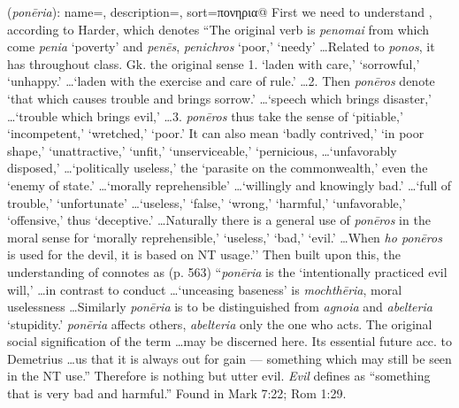 \item[Evil,]

(\textit{ponēria}):
{
    name=,
    description={},
    sort=πονηρια@
}
First we need to understand , according to Harder, which denotes ``The original verb is \emph{penomai} from which come \emph{penia} `poverty' and \emph{penēs}, \emph{penichros} `poor,' `needy' \ldots Related to \emph{ponos}, it has throughout class. Gk. the original sense 1. `laden with care,' `sorrowful,' `unhappy.' \ldots `laden with the exercise and care of rule.' \ldots 2. Then \emph{ponēros} denote `that which causes trouble and brings sorrow.' \ldots  `speech which brings disaster,' \ldots  `trouble which brings evil,' \ldots 3. \emph{ponēros} thus take the sense of `pitiable,' `incompetent,' `wretched,' `poor.' It can also mean `badly contrived,' `in poor shape,' `unattractive,' `unfit,' `unserviceable,' `pernicious, \ldots `unfavorably disposed,' \ldots `politically useless,' the `parasite on the commonwealth,' even the `enemy of state.' \ldots `morally reprehensible' \ldots `willingly and knowingly bad.' \ldots `full of trouble,' `unfortunate' \ldots `useless,' `false,' `wrong,' `harmful,' `unfavorable,' `offensive,' thus `deceptive.' \ldots Naturally there is a general use of \emph{ponēros} in the moral sense for `morally reprehensible,' `useless,' `bad,' `evil.' \ldots When \emph{ho ponēros} is used for the devil, it is based on NT usage.''
Then built upon this, the understanding of  connotes as (p. 563) ``\emph{ponēria} is the `intentionally practiced evil will,' \ldots in contrast to conduct \ldots `unceasing baseness' is \emph{mochthēria}, moral uselessness \ldots Similarly \emph{ponēria} is to be distinguished from \emph{agnoia} and \emph{abelteria} `stupidity.' \emph{ponēria} affects others, \emph{abelteria} only the one who acts. The original social signification of the term \ldots may be discerned here. Its essential future acc. to Demetrius \ldots us that it is always out for gain --- something which may still be seen in the NT use.''
Therefore  is nothing but utter evil. \emph{Evil} defines as ``something that is very bad and harmful.''
Found in Mark 7:22; Rom 1:29.
